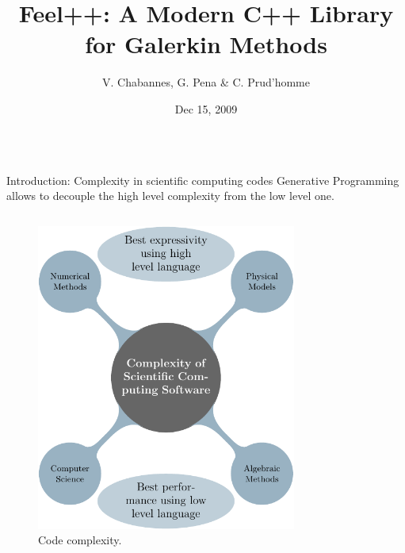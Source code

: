 \documentclass[final,utf8,,hyperref={pdfpagelabels=false}]{beamer}
\title[Feel++]{Feel++: A Modern C++ Library for Galerkin Methods}
\author[V. Chabannes, G. Pena \& C. Prud'homme]{V. Chabannes, G. Pena \& C. Prud'homme}
\institute[U. Coimbra \& U. Grenoble]{U. Coimbra and U. de Grenoble}
\date{Dec 15, 2009}
\begin{document}
  \begin{frame}[containsverbatim]{} 
    \vfill
    \begin{columns}[t]
    \begin{block}{Introduction: Complexity in scientific computing codes}
      Generative Programming allows to decouple the high level complexity from
      the low level one.
      \begin{columns}[t]
        \begin{figure}[c]
          \includegraphics[width=.9\linewidth]{genprog1-crop}
          \caption{Code complexity.}
          \label{fig:10}
      \end{figure}
        \begin{figure}[c]

\end{figure}
\end{columns}
\end{block}
\end{columns}
\end{frame}
\end{document}
